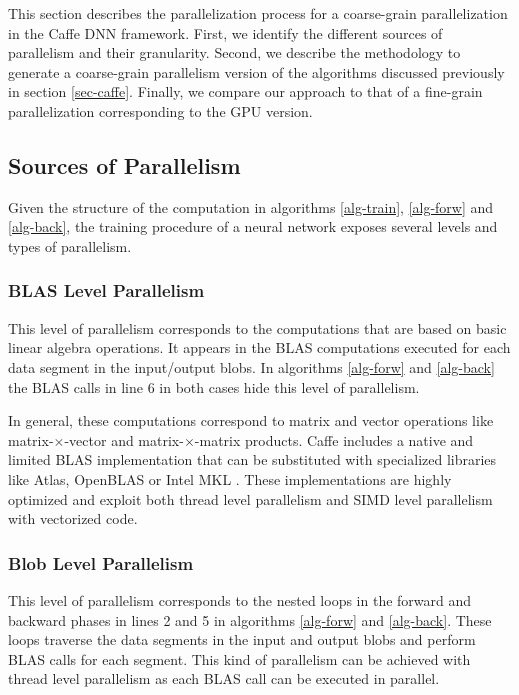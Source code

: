 This section describes the parallelization process for a coarse-grain 
parallelization in the Caffe DNN framework. First, we identify the 
different sources of parallelism and their granularity. Second, we 
describe the methodology to generate a coarse-grain parallelism version 
of the algorithms discussed previously in section \ref{sec-caffe}. Finally, 
we compare our approach to that of a fine-grain parallelization 
corresponding to the GPU version.

\subsection{Sources of Parallelism}
Given the structure of the computation in algorithms \ref{alg-train}, 
\ref{alg-forw} and \ref{alg-back}, the training procedure of a neural 
network exposes several levels and types of parallelism.

\subsubsection{BLAS Level Parallelism}
This level of parallelism corresponds to the computations that 
are based on basic linear algebra operations. It appears in the 
BLAS computations executed for each data segment in the input/output blobs.
In algorithms \ref{alg-forw} and \ref{alg-back} the BLAS calls in line 
6 in both cases hide this level of parallelism.

In general, these computations correspond to matrix and
vector operations like matrix-$\times$-vector and matrix-$\times$-matrix
products. Caffe includes a native and limited BLAS implementation that 
can be substituted with specialized libraries like Atlas, OpenBLAS  or Intel MKL \cite{blackford2002updated,dongarra2002preface}. These implementations are highly optimized and exploit both thread level parallelism and SIMD level parallelism with vectorized code.

\subsubsection{Blob Level Parallelism}
This level of parallelism corresponds to the nested loops in the forward
and backward phases in lines 2 and 5 in algorithms 
\ref{alg-forw} and \ref{alg-back}. 
These loops traverse the data segments in the input and output blobs and
perform BLAS calls for each segment. This kind of parallelism can be
achieved with thread level parallelism as each BLAS call can be
executed in parallel.

